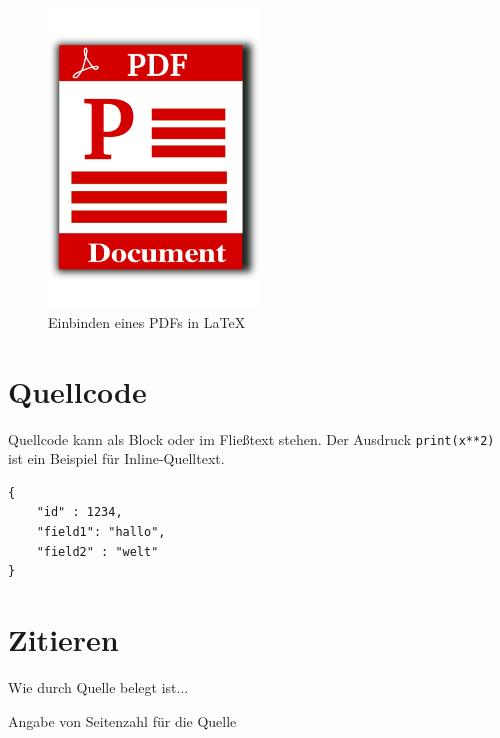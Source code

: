 \begin{figure}[h!]
    \centering
    \includegraphics[width=0.5\textwidth]{img/Example.pdf}
    \caption[Beispiel für PDF-Einbindung]{Einbinden eines PDFs in LaTeX}
    \label{fig_example_pdf}
\end{figure}

\section{Quellcode}
Quellcode kann als Block oder im Fließtext stehen. Der Ausdruck \texttt{print(x**2)} ist ein Beispiel für Inline-Quelltext.

\begin{verbatim}
{   
    "id" : 1234,  
    "field1": "hallo",  
    "field2" : "welt"
}
\end{verbatim}

\section{Zitieren}
Wie durch Quelle \cite{Nobody06} belegt ist...

Angabe von Seitenzahl für die Quelle \cite[S. 5ff]{Nobody07}
